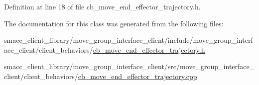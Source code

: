 Definition at line 18 of file cb\+\_\+move\+\_\+end\+\_\+effector\+\_\+trajectory.\+h.



The documentation for this class was generated from the following files\+:\begin{DoxyCompactItemize}
\item 
smacc\+\_\+client\+\_\+library/move\+\_\+group\+\_\+interface\+\_\+client/include/move\+\_\+group\+\_\+interface\+\_\+client/client\+\_\+behaviors/\hyperlink{cb__move__end__effector__trajectory_8h}{cb\+\_\+move\+\_\+end\+\_\+effector\+\_\+trajectory.\+h}\item 
smacc\+\_\+client\+\_\+library/move\+\_\+group\+\_\+interface\+\_\+client/src/move\+\_\+group\+\_\+interface\+\_\+client/client\+\_\+behaviors/\hyperlink{cb__move__end__effector__trajectory_8cpp}{cb\+\_\+move\+\_\+end\+\_\+effector\+\_\+trajectory.\+cpp}\end{DoxyCompactItemize}
